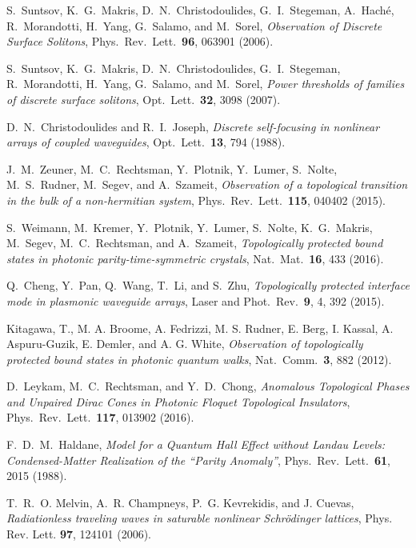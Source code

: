 \documentclass[aps,prx,twocolumn,superscriptaddress]{revtex4-1}
\begin{document}
\begin{thebibliography}{99}
 S.~Suntsov, K.~G.~Makris, D.~N.~Christodoulides, G.~I.~Stegeman, A.~Hach\'e, R.~Morandotti, H.~Yang, G.~Salamo, and M.~Sorel, \textit{Observation of Discrete Surface Solitons}, Phys.~Rev.~Lett.~\textbf{96}, 063901 (2006).

 S.~Suntsov, K.~G.~Makris, D.~N.~Christodoulides, G.~I.~Stegeman, R.~Morandotti, H.~Yang, G.~Salamo, and M.~Sorel, \textit{Power thresholds of families of discrete surface solitons}, Opt.~Lett.~\textbf{32}, 3098 (2007).

 D.~N.~Christodoulides and R.~I.~Joseph, \textit{Discrete self-focusing in nonlinear arrays of coupled waveguides}, Opt.~Lett.~\textbf{13}, 794 (1988).

 J.~M.~Zeuner, M.~C.~Rechtsman, Y.~Plotnik, Y.~Lumer, S.~Nolte, M.~S.~Rudner, M.~Segev, and A.~Szameit, \textit{Observation of a topological transition in the bulk of a non-hermitian system}, Phys.~Rev.~Lett.~\textbf{115}, 040402 (2015).

 S.~Weimann, M.~Kremer, Y.~Plotnik, Y.~Lumer, S.~Nolte, K.~G.~Makris, M.~Segev, M.~C.~Rechtsman, and A.~Szameit, \textit{Topologically protected bound states in photonic parity-time-symmetric crystals}, Nat.~Mat.~\textbf{16}, 433 (2016).

 Q.~Cheng, Y.~Pan, Q.~Wang, T.~Li, and S.~Zhu, \textit{Topologically protected interface mode in plasmonic waveguide arrays},
  Laser and Phot.~Rev.~\textbf{9}, 4, 392 (2015).

Kitagawa, T., M. A. Broome, A. Fedrizzi, M. S. Rudner, E. Berg, I. Kassal, A. Aspuru-Guzik, E. Demler, and A. G. White, \textit{Observation of topologically protected bound states in photonic quantum walks}, Nat.~Comm.~\textbf{3}, 882 (2012).

D.~Leykam, M.~C.~Rechtsman, and Y.~D.~Chong, \textit{Anomalous Topological Phases and Unpaired Dirac Cones in Photonic Floquet Topological Insulators}, Phys.~Rev.~Lett.~\textbf{117}, 013902 (2016).

 F.~D.~M.~Haldane, {\it Model for a Quantum Hall Effect without Landau Levels: Condensed-Matter Realization of the ``Parity Anomaly''}, Phys.~Rev.~Lett.~{\bf 61}, 2015 (1988).

T.~R.~O. Melvin, A.~R. Champneys, P.~G. Kevrekidis, and J. Cuevas, {\it Radiationless traveling waves in saturable nonlinear Schr\"odinger lattices}, Phys. Rev. Lett. {\bf 97}, 124101 (2006).


\end{thebibliography}
\end{document}
